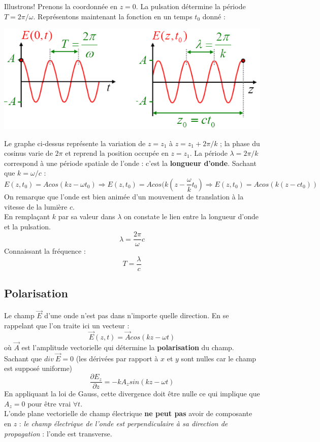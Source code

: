 \documentclass	[11pt, a4paper, openany]{book}
\begin{document}
Illustrons! Prenons la coordonnée en $z = 0$. La pulsation détermine la période $T = 2\pi /\omega$. Représentons maintenant la fonction en un temps $t_0$ donné : 
\begin{center}
\includegraphics[scale=0.5]{oo/image33.png}
\end{center}
Le graphe ci-dessus représente la variation de $z = z_1$ à $z = z_1 + 2\pi/k$ ; la phase du cosinus varie de $2\pi$ et reprend la position occupée en $z = z_1$.
La période $\lambda = 2\pi / k$ correspond à une période spatiale de l'onde : c'est la \textbf{longueur d'onde}. Sachant que $k = \omega/c$ :
\begin{equation}
E(z, t_0) = Acos(kz - \omega t_0) \Rightarrow E(z, t_0) = Acos(k(z - \frac{\omega}{k} t_0) \Rightarrow E(z, t_0) = Acos(k(z - c t_0))
\end{equation}
On remarque que l'onde est bien animée d'un mouvement de translation à la vitesse de la lumière $c$.\\

En remplaçant $k$ par sa valeur dans $\lambda$ on constate le lien entre la longueur d'onde et la pulsation.
\begin{equation}
\lambda = \frac{2\pi}{\omega}c
\end{equation}
Connaissant la fréquence : 
\begin{equation}
T = \frac{\lambda}{c}
\end{equation}

\subsection{Polarisation}
Le champ $\vec{E}$ d'une onde n'est pas dans n'importe quelle direction. En se rappelant que l'on traite ici un vecteur : 
\begin{equation}
\vec{E}(z, t) = \vec{A}cos(kz - \omega t)
\end{equation}
où $\vec{A}$ est l'amplitude vectorielle qui détermine la \textbf{polarisation} du champ. Sachant que $div\ \vec{E} = 0$ (les dérivées par rapport à $x$ et $y$ sont nulles car le champ est supposé uniforme)
\begin{equation}
\frac{\partial E_z}{\partial z} = -kA_z sin(kz - \omega t)
\end{equation}
En appliquant la loi de Gauss, cette divergence doit être nulle ce qui implique que $A_z = 0$ pour être vrai $\forall t$. \\
L'onde plane vectorielle de champ électrique \textbf{ne peut pas} avoir de composante en $z$ : \textit{le champ électrique de l'onde est perpendiculaire à sa direction de propagation} : l'onde est transverse.\\
\end{document}
